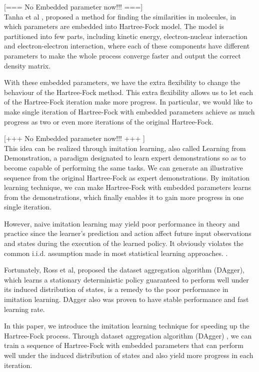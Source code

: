 \documentclass[twoside]{article}
\begin{document}
[=== No Embedded parameter now!!! ===] \\

Tanha et al \cite{Matteus}, proposed a method for finding the similarities in molecules, in which parameters are embedded into Hartree-Fock model. The model is partitioned into few parts, including  kinetic energy, electron-nuclear interaction and electron-electron interaction, where each of these components have different parameters to make the whole process converge faster and output the correct density matrix.

With these embedded parameters,  we have the extra flexibility to change the behaviour of the Hartree-Fock method. This extra flexibility allows us to let each of the Hartree-Fock iteration make more progress. In particular, we would like to make single iteration of Hartree-Fock with embedded parameters achieve as much progress as two or even more iterations of the original Hartree-Fock.

[+++ No Embedded parameter now!!! +++ ] \\

This idea can be realized through imitation learning, also called Learning from Demonstration, a paradigm designated to learn expert demonstrations so as to become capable of performing the same tasks. 
We can generate an illustrative sequence from the original Hartree-Fock as expert demonstrations. By imitation learning technique, we can make 
Hartree-Fock with embedded parameters learns from the demonstrations,  which finally enables it to gain more progress in one single iteration.


However, naive imitation learning may yield poor performance in theory and practice since the learner's prediction and action affect future input observations and states during the execution of the learned policy. It obviously violates the common i.i.d. assumption made in most statistical learning approaches. \cite{Ross}.


Fortunately, Ross et al,\cite{DAgger} proposed the dataset aggregation algorithm (DAgger), which learns a stationary deterministic policy guaranteed to perform well under its induced distribution of states, is a remedy to the poor performance in imitation learning. DAgger also was proven to have stable performance and fast learning rate. \cite{DAggerCompare}

In this paper,  we introduce the imitation learning technique for speeding up the Hartree-Fock process. 
Through dataset aggregation algorithm (DAgger) \cite{DAgger}, we can train a sequence of Hartree-Fock with embedded parameters that can perform well under the induced distribution of states and also yield more progress in each iteration. 
\end{document}
